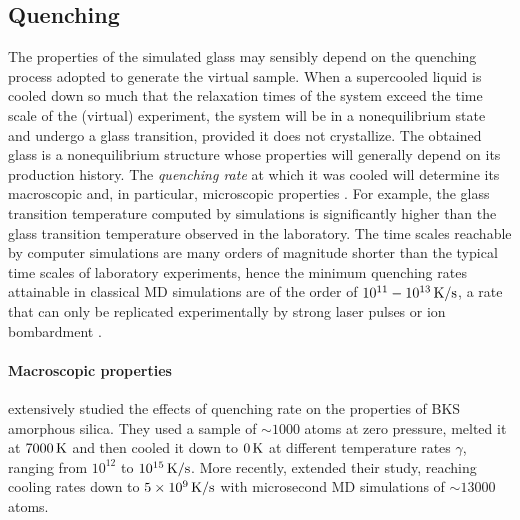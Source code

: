 \subsection{Quenching}  \label{sec:glass-quenching}
The properties of the simulated glass may sensibly depend on the quenching process adopted to generate the virtual sample. 
When a supercooled liquid is cooled down so much that the relaxation times of the system exceed the time scale of the (virtual) experiment, the system will be in a nonequilibrium state and undergo a glass transition, provided it does not crystallize. The obtained glass is a nonequilibrium structure whose properties will generally depend on its production history. The \emph{quenching rate} at which it was cooled will determine its macroscopic and, in particular, microscopic properties \cite{Vollmayr1996}. 
For example, the glass transition temperature computed by simulations is significantly higher than the glass transition temperature observed in the laboratory. 
The time scales reachable by computer simulations are many orders of magnitude shorter than the typical time scales of laboratory experiments, hence the minimum quenching rates attainable in classical MD simulations are of the order of $10^{11}-10^{13}\,\mathrm{K/s}$, a rate that can only be replicated experimentally by strong laser pulses or ion bombardment \cite{Soules2011}.

\paragraph{Macroscopic properties}
\citet{Vollmayr1996} extensively studied the effects of quenching rate on the properties of BKS amorphous silica. They used a sample of $\sim 1000$ atoms at zero pressure, melted it at $7000\,\mathrm{K}$ and then cooled it down to $0\,\mathrm{K}$ at different temperature rates $\gamma$, ranging from $10^{12}$ to $10^{15}\,\mathrm{K/s}$. More recently, \cite{Lane2015} extended their study, reaching cooling rates down to $5\times 10^{9}\,\mathrm{K/s}$ with microsecond MD simulations of $\sim 13000$ atoms.

